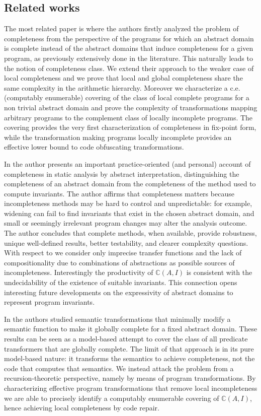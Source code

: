\documentclass[runningheads]{llncs}
\def\re{c.e.}
\def\bbbc{{\mathbb{C}}}
\def\cAA{\ensuremath{A}}
\begin{document}
\subsection{Related works}

The most related paper is \cite{GiacobazziLR15} where the authors firstly analyzed the problem of completeness from the perspective of the programs for which an abstract domain is complete instead of the abstract domains that induce completeness for a given program, as previously extensively done in the literature. This naturally leads to the notion of completeness class. We extend their approach to the weaker case of local completeness and we prove that local and global completeness share the same complexity in the arithmetic hierarchy. Moreover we characterize a {\re} (computably enumerable) covering of the class of local complete programs for a non trivial abstract domain and prove the complexity of transformations mapping arbitrary programs to the complement class of locally incomplete programs. The covering provides the very first characterization of completeness in fix-point form, while the transformation making programs locally incomplete  provides an effective lower bound to code obfuscating transformations.

In \cite{DMonniaux23} the author presents an important practice-oriented (and personal) account of completeness in static analysis by abstract interpretation, distinguishing the completeness of an abstract domain from the completeness of the method used to compute invariants. The author affirms that completeness matters because incompleteness methods may be hard to control and unpredictable: for example, widening can fail to find invariants that exist in the chosen abstract domain, and small or seemingly irrelevant program changes may alter the analysis outcome. The author concludes that complete methods, when available, provide robustness, unique well-defined results, better testability, and clearer complexity questions. 
%
With respect to \cite{DMonniaux23} we consider only imprecise transfer functions and the lack of compositionality due to combinations of abstractions as possible sources of incompleteness. Interestingly the productivity of $\bbbc(\cAA,I)$ is consistent with the undecidability of the existence of suitable invariants. This connection opens interesting future developments on the expressivity of abstract domains to represent program invariants.

In \cite{GiacobazziM16} the authors studied semantic transformations that minimally modify a semantic function to make it globally complete for a fixed abstract domain. These results can be seen as a model-based attempt to cover the class of all predicate transformers that are globally complete. The limit of that approach is in its pure model-based nature: it transforms the semantics to achieve completeness, not the code that computes that semantics. 
We instead attack the problem from a recursion-theoretic perspective, namely by means of program transformations. By characterizing effective program transformations that remove local incompleteness we are able to precisely identify a computably enumerable covering of $\bbbc(\cAA,I)$, hence achieving local completeness by code repair.
\end{document}
